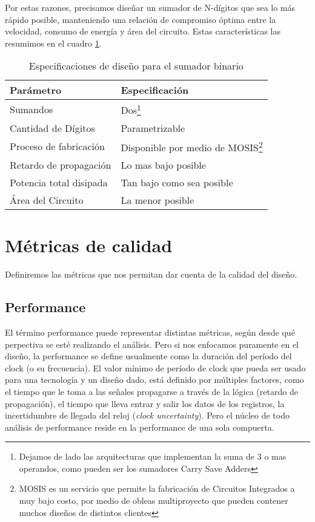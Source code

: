Por estas razones, precisamos diseñar un sumador de N-dígitos que sea lo más rápido posible, manteniendo una relación de compromiso óptima entre la velocidad, consumo de energía y área del circuito.
Estas características las resumimos en el cuadro \ref{cuadro:especifaciones}.
\begin{savenotes}
\begin{table}[h]
\centering
\begin{tabular}{@{}ll@{}}
\toprule
\textbf{Parámetro}  & \textbf{Especificación} \\ \midrule
Sumandos & Dos\footnote{Dejamos de lado las arquitecturas que implementan la suma de 3 o mas operandos, como pueden ser los sumadores Carry Save Adders} \\	
Cantidad de Dígitos & Parametrizable \\
Proceso de fabricación  & Disponible por medio de MOSIS\footnote{MOSIS es un servicio que permite la fabricación de Circuitos Integrados a muy bajo costo, por medio de obleas multiproyecto que pueden contener muchos diseños de distintos clientes} \\ 
Retardo de propagación  & Lo mas bajo posible                 \\
Potencia total disipada & Tan bajo como sea posible                 \\
Área del Circuito       & La menor posible                \\ \bottomrule
\end{tabular}
\caption{Especificaciones de diseño para el sumador binario}
\label{cuadro:especifaciones}
\end{table}
\end{savenotes}


\section{Métricas de calidad}
Definiremos las métricas que nos permitan dar cuenta de la calidad del diseño.
\subsection{Performance}

El término performance puede representar distintas métricas, según desde qué perpectiva se esté realizando el análisis. Pero si nos enfocamos puramente en el diseño, la performance se define usualmente\cite{rabaey2003} como la duración del período del clock (o su frecuencia). El valor mínimo de período de clock que pueda ser usado para una tecnología y un diseño dado, está definido por múltiples factores, como el tiempo que le toma a las señales propagarse a través de la lógica (retardo de propagación), el tiempo que lleva entrar y salir los datos de los registros, la incertidumbre de llegada del reloj (\emph{clock uncertainty}). Pero el núcleo de todo análisis de performance reside en la performance de una sola compuerta.

